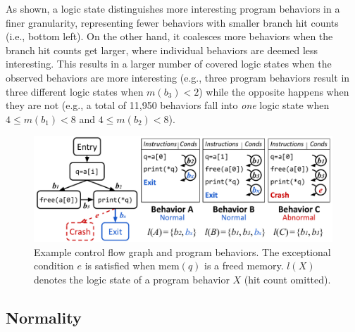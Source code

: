 \documentclass[letterpaper,twocolumn,10pt]{article}
\begin{document}
As shown, a logic state distinguishes more interesting program behaviors in a
finer granularity, representing fewer behaviors with smaller branch hit counts
(i.e., bottom left). On the other hand, it coalesces more behaviors when
the branch hit counts get larger, where individual behaviors are deemed less
interesting. 
%
This results in a larger number of covered logic states when the observed
behaviors are more interesting (e.g., three program behaviors result in
three different logic states when $m(b_3)<2$) while the opposite happens when
they are not (e.g., a total of 11,950 behaviors fall into \emph{one} logic state
when $4 \le m(b_1) < 8$ and $4 \le m(b_2) < 8$).


\begin{figure}[t]
  \centering
  \includegraphics[width=\columnwidth]{images/local.pdf}
  \caption{Example control flow graph and program behaviors. The exceptional
  condition $e$ is satisfied when $\mathrm{mem}(q)$ is a freed memory. $l(X)$
  denotes the logic state of a program behavior $X$ (hit count omitted).}
  \label{f:local}
\end{figure}

\subsection{Normality}
\label{s:prop:local}
\end{document}
